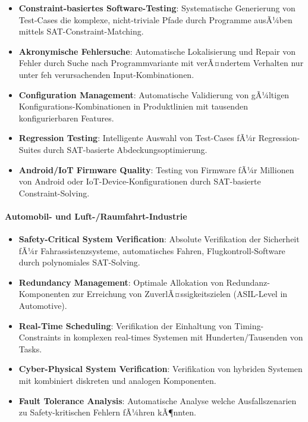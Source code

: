 ﻿\documentclass[a4paper,12pt]{article}
\theoremstyle{definition}
\begin{document}
\begin{itemize}
	\item \textbf{Constraint-basiertes Software-Testing}: Systematische Generierung von Test-Cases die komplexe, nicht-triviale Pfade durch Programme ausÃ¼ben mittels SAT-Constraint-Matching.
	
	\item \textbf{Akronymische Fehlersuche}: Automatische Lokalisierung und Repair von Fehler durch Suche nach Programmvariante mit verÃ¤ndertem Verhalten nur unter feh verursachenden Input-Kombinationen.
	
	\item \textbf{Configuration Management}: Automatische Validierung von gÃ¼ltigen Konfigurations-Kombinationen in Produktlinien mit tausenden konfigurierbaren Features.
	
	\item \textbf{Regression Testing}: Intelligente Auswahl von Test-Cases fÃ¼r Regression-Suites durch SAT-basierte Abdeckungsoptimierung.
	
	\item \textbf{Android/IoT Firmware Quality}: Testing von Firmware fÃ¼r Millionen von Android oder IoT-Device-Konfigurationen durch SAT-basierte Constraint-Solving.
\end{itemize}

\paragraph{Automobil- und Luft-/Raumfahrt-Industrie}

\begin{itemize}
	\item \textbf{Safety-Critical System Verification}: Absolute Verifikation der Sicherheit fÃ¼r Fahrassistenzsysteme, automatisches Fahren, Flugkontroll-Software durch polynomiales SAT-Solving.
	
	\item \textbf{Redundancy Management}: Optimale Allokation von Redundanz-Komponenten zur Erreichung von ZuverlÃ¤ssigkeitszielen (ASIL-Level in Automotive).
	
	\item \textbf{Real-Time Scheduling}: Verifikation der Einhaltung von Timing-Constraints in komplexen real-times Systemen mit Hunderten/Tausenden von Tasks.
	
	\item \textbf{Cyber-Physical System Verification}: Verifikation von hybriden Systemen mit kombiniert diskreten und analogen Komponenten.
	
	\item \textbf{Fault Tolerance Analysis}: Automatische Analyse welche Ausfallszenarien zu Safety-kritischen Fehlern fÃ¼hren kÃ¶nnten.
\end{itemize}
\end{document}
